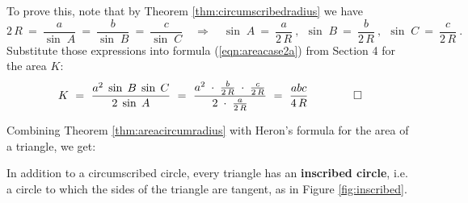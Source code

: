 
To prove this, note that by Theorem \ref{thm:circumscribedradius} we have
\begin{displaymath}
 2\,R ~=~ \frac{a}{\sin\;A} ~=~ \frac{b}{\sin\;B} ~=~ \frac{c}{\sin\;C} \quad\Rightarrow\quad
  \sin\;A ~=~ \frac{a}{2\,R} ~,~~ \sin\;B ~=~ \frac{b}{2\,R} ~,~~ \sin\;C ~=~ \frac{c}{2\,R} ~.
\end{displaymath}
Substitute those expressions into formula (\ref{eqn:areacase2a}) from Section 4 for the area $K$:
\begin{displaymath}
 K ~=~ \frac{a^2 \;\sin\;B \;\sin\;C}{2\;\sin\;A} ~=~
  \frac{a^2 \;\cdot\; \frac{b}{2\,R} \;\cdot\; \frac{c}{2\,R}}{2\;\cdot\; \frac{a}{2\,R}}
  ~=~ \frac{abc}{4\,R}  \qquad\qed
\end{displaymath}

\noindent Combining Theorem \ref{thm:areacircumradius} with Heron's formula for the area of a
triangle, we get:


In addition to a circumscribed circle, every triangle has an \textbf{inscribed circle}, i.e. a
circle to which the sides of the triangle are
tangent, as in Figure \ref{fig:inscribed}.

